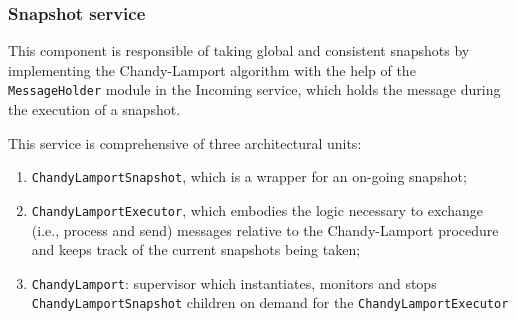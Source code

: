 \subsubsection{Snapshot service}
This component is responsible of taking global and consistent snapshots by
implementing the Chandy-Lamport algorithm with the help of the
\texttt{MessageHolder} module in the Incoming service, which holds the message
during the execution of a snapshot.

This service is comprehensive of three architectural units:

\begin{enumerate}
  \item \texttt{ChandyLamportSnapshot}, which is a wrapper for an on-going
        snapshot;
  \item \texttt{ChandyLamportExecutor}, which embodies the logic necessary to
        exchange (i.e., process and send) messages relative to the
        Chandy-Lamport procedure and keeps track of the current snapshots being
        taken;
  \item \texttt{ChandyLamport}: supervisor which instantiates, monitors and
        stops \texttt{ChandyLamportSnapshot} children on demand for the
        \texttt{ChandyLamportExecutor}
\end{enumerate}
